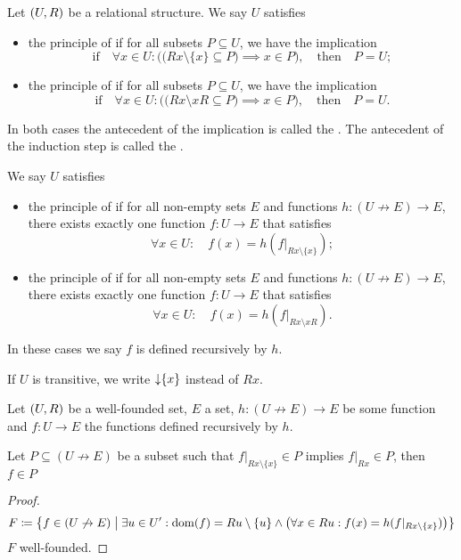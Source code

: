 \begin{definition}
Let $\sSet{U, R}$ be a relational structure. We say $U$ satisfies
\begin{itemize}
\item the principle of  if for all subsets $P\subseteq U$, we have the implication
\[ \text{if}\quad  \forall x\in U: \Big(\big(Rx\setminus\{x\}\subseteq P\big)\implies x\in P\Big), \quad \text{then}\quad P=U; \]
\item the principle of  if for all subsets $P\subseteq U$, we have the implication
\[ \text{if}\quad  \forall x\in U: \Big(\big(Rx\setminus xR\subseteq P\big)\implies x\in P\Big), \quad \text{then}\quad P=U. \]
\end{itemize}
In both cases the antecedent of the implication is called the . The antecedent of the induction step is called the .

We say $U$ satisfies
\begin{itemize}
\item the principle of  if for all non-empty sets $E$ and functions $h: (U\not\to E)\to E$, there exists exactly one function $f: U\to E$ that satisfies
\[ \forall x\in U: \quad f(x) = h(f|_{Rx\setminus\{x\}}); \]
\item the principle of  if for all non-empty sets $E$ and functions $h: (U\not\to E)\to E$, there exists exactly one function $f: U\to E$ that satisfies
\[ \forall x\in U: \quad f(x) = h(f|_{Rx\setminus xR}). \]
\end{itemize}
In these cases we say $f$ is defined recursively by $h$.
\end{definition}

If $U$ is transitive, we write $\operatorname{\downarrow}\{x\}$ instead of $Rx$.

\begin{proposition}
Let $\sSet{U,R}$ be a well-founded set, $E$ a set, $h:(U\not\to E)\to E$ be some function and $f: U\to E$ the functions defined recursively by $h$.

Let $P \subseteq (U\not\to E)$ be a subset such that $f|_{Rx\setminus\{x\}} \in P$ implies $f|_{Rx}\in P$, then $f\in P$
\end{proposition}
\begin{proof}
\[ F \defeq \setbuilder{f\in (U\not\to E)}{\exists u\in U': \dom(f) = Ru\setminus\{u\} \land \big(\forall x\in Ru: f(x) = h(f|_{Rx\setminus \{x\}}) \big)} \]
$F$ well-founded. 
\end{proof}

